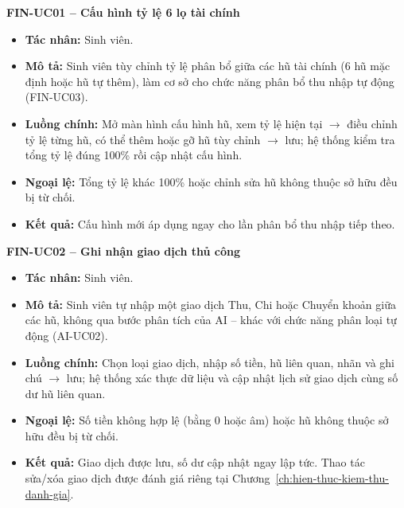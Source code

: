 \noindent\textbf{FIN-UC01 -- Cấu hình tỷ lệ 6 lọ tài chính}
\begin{itemize}
    \item \textbf{Tác nhân:} Sinh viên.
    \item \textbf{Mô tả:} Sinh viên tùy chỉnh tỷ lệ phân bổ giữa các hũ tài chính (6 hũ mặc định hoặc hũ tự thêm), làm cơ sở cho chức năng phân bổ thu nhập tự động (FIN-UC03).
    \item \textbf{Luồng chính:} Mở màn hình cấu hình hũ, xem tỷ lệ hiện tại $\rightarrow$ điều chỉnh tỷ lệ từng hũ, có thể thêm hoặc gỡ hũ tùy chỉnh $\rightarrow$ lưu; hệ thống kiểm tra tổng tỷ lệ đúng 100\% rồi cập nhật cấu hình.
    \item \textbf{Ngoại lệ:} Tổng tỷ lệ khác 100\% hoặc chỉnh sửa hũ không thuộc sở hữu đều bị từ chối.
    \item \textbf{Kết quả:} Cấu hình mới áp dụng ngay cho lần phân bổ thu nhập tiếp theo.
\end{itemize}

\noindent\textbf{FIN-UC02 -- Ghi nhận giao dịch thủ công}
\begin{itemize}
    \item \textbf{Tác nhân:} Sinh viên.
    \item \textbf{Mô tả:} Sinh viên tự nhập một giao dịch Thu, Chi hoặc Chuyển khoản giữa các hũ, không qua bước phân tích của AI -- khác với chức năng phân loại tự động (AI-UC02).
    \item \textbf{Luồng chính:} Chọn loại giao dịch, nhập số tiền, hũ liên quan, nhãn và ghi chú $\rightarrow$ lưu; hệ thống xác thực dữ liệu và cập nhật lịch sử giao dịch cùng số dư hũ liên quan.
    \item \textbf{Ngoại lệ:} Số tiền không hợp lệ (bằng 0 hoặc âm) hoặc hũ không thuộc sở hữu đều bị từ chối.
    \item \textbf{Kết quả:} Giao dịch được lưu, số dư cập nhật ngay lập tức. Thao tác sửa/xóa giao dịch được đánh giá riêng tại Chương~\ref{ch:hien-thuc-kiem-thu-danh-gia}.
\end{itemize}

